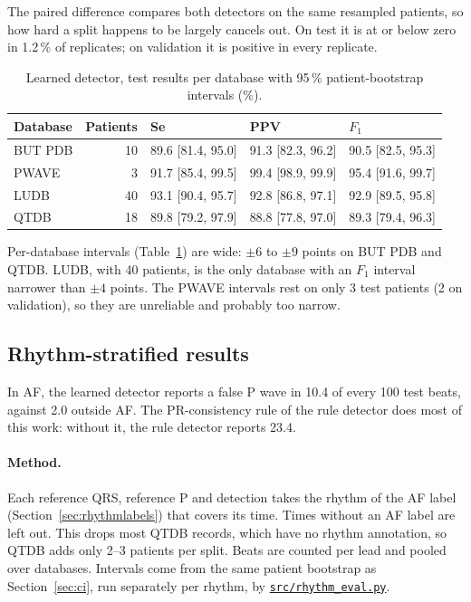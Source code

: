 \documentclass[11pt,a4paper]{article}
\newcommand{\code}[1]{\texttt{#1}}
\newcommand{\repourl}{https://github.com/BierschneiderEmanuel/pWaveDetection}
\newcommand{\repofile}[2]{\href{\repourl/blob/main/#2}{\code{#1}}}
\begin{document}
The paired difference compares both detectors on the same resampled patients, so how hard a split happens to be largely cancels out. On test it is at or below zero in 1.2\,\% of replicates; on validation it is positive in every replicate.

\begin{table}[htbp]
\centering\small
\caption{Learned detector, test results per database with 95\,\% patient-bootstrap intervals (\%).}
\label{tab:cidb}
\begin{tabular}{lrlll}
\toprule
Database & Patients & Se & PPV & $F_1$ \\
\midrule
BUT PDB & 10 & 89.6 [81.4, 95.0] & 91.3 [82.3, 96.2] & 90.5 [82.5, 95.3] \\
PWAVE & 3 & 91.7 [85.4, 99.5] & 99.4 [98.9, 99.9] & 95.4 [91.6, 99.7] \\
LUDB & 40 & 93.1 [90.4, 95.7] & 92.8 [86.8, 97.1] & 92.9 [89.5, 95.8] \\
QTDB & 18 & 89.8 [79.2, 97.9] & 88.8 [77.8, 97.0] & 89.3 [79.4, 96.3] \\
\bottomrule
\end{tabular}
\end{table}

Per-database intervals (Table~\ref{tab:cidb}) are wide: $\pm6$ to $\pm9$ points on BUT PDB and QTDB. LUDB, with 40 patients, is the only database with an $F_1$ interval narrower than $\pm4$ points. The PWAVE intervals rest on only 3 test patients (2 on validation), so they are unreliable and probably too narrow.

\subsection{Rhythm-stratified results}
\label{sec:rhythm}

In AF, the learned detector reports a false P wave in 10.4 of every 100 test beats, against 2.0 outside AF. The PR-consistency rule of the rule detector does most of this work: without it, the rule detector reports 23.4.

\paragraph{Method.} Each reference QRS, reference P and detection takes the rhythm of the AF label (Section~\ref{sec:rhythmlabels}) that covers its time. Times without an AF label are left out. This drops most QTDB records, which have no rhythm annotation, so QTDB adds only 2--3 patients per split. Beats are counted per lead and pooled over databases. Intervals come from the same patient bootstrap as Section~\ref{sec:ci}, run separately per rhythm, by \repofile{src/rhythm\_eval.py}{src/rhythm_eval.py}.
\end{document}
